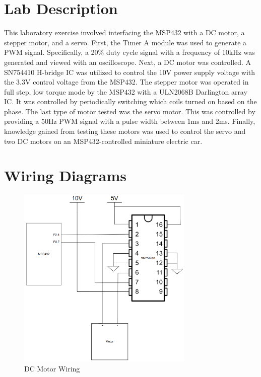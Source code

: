 \documentclass[CMPE]{KGCOEReport}
\begin{document}
\maketitle

\section*{Lab Description}

This laboratory exercise involved interfacing the MSP432 with a DC motor, a stepper motor, and a servo. First, the Timer A module was used to generate a PWM signal. Specifically, a 20\% duty cycle signal with a frequency of 10kHz was generated and viewed with an oscilloscope. Next, a DC motor was controlled. A SN754410 H-bridge IC was utilized to control the 10V power supply voltage with the 3.3V control voltage from the MSP432. The stepper motor was operated in full step, low torque mode by the MSP432 with a ULN2068B Darlington array IC. It was controlled by periodically switching which coils turned on based on the phase. The last type of motor tested was the servo motor. This was controlled by providing a 50Hz PWM signal with a pulse width between 1ms and 2ms. Finally, knowledge gained from testing these motors was used to control the servo and two DC motors on an MSP432-controlled miniature electric car.

\section*{Wiring Diagrams}

\begin{figure}[H]
    \centering
    \includegraphics[width=0.75\textwidth]{DCMotorWiring.png}
    \caption{DC Motor Wiring}
    \label{fig:DCMotorWiring}
\end{figure}
\end{document}
